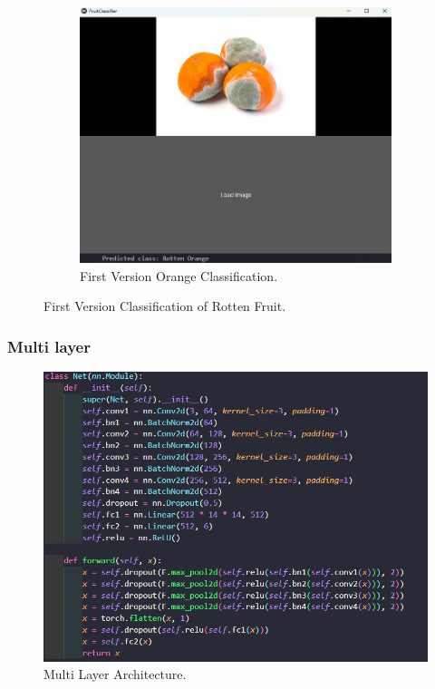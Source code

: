 \documentclass[conference]{IEEEtran}
\begin{document}
\begin{figure}[h]
\begin{subfigure}[b]{0.48\linewidth}
        \label{figFB}
    \end{subfigure}
    \hfill
    \begin{subfigure}[b]{0.48\linewidth}
        \centering
        \includegraphics[width=\linewidth]{1layer orageR3.png}
        \caption{First Version Orange Classification.}
        \label{figFB}
    \end{subfigure}
    \caption{First Version Classification of Rotten Fruit.}
    \label{Fig1R}
\end{figure}

\subsubsection{Multi layer}

\begin{figure}[h]
    \centering
    \includegraphics[width=\linewidth]{multi architecture.png}
    \caption{Multi Layer Architecture.}
    \label{figMl}
\end{figure}
\end{document}
